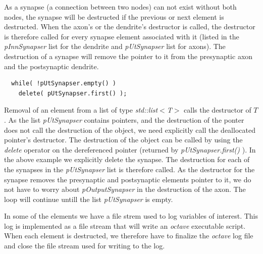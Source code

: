 	As a synapse (a connection between two nodes) can not exist without both nodes, the synapse will be destructed if the previous or next element is destructed.
	When the axon's or the dendrite's destructor is called, the destructor is therefore called for every synapse element associated with it (listed in the \emph{pInnSynapser} list for the dendrite and \emph{pUtSynapser} list for axons).
	The destruction of a synapse will remove the pointer to it from the presynaptic axon and the postsynaptic dendrite.
%

\begin{lstlisting}
  while( !pUtSynapser.empty() )
  	delete( pUtSynapser.first() );
\end{lstlisting}

	Removal of an element from a list of type \emph{std::list$<$T$>$} calls the destructor of $T$.
	As the list \emph{pUtSynapser} contains pointers, and the destruction of the ponter does not call the destruction of the object, we need explicitly call the deallocated pointer's destructor.
	The destruction of the object can be called by using the \emph{delete} operator on the dereferenced pointer (returned by \emph{pUtSynapser.first()} ).
	In the above example we explicitly delete the synapse. %
	The destruction for each of the synapses in the \emph{pUtSynapser} list is therefore called.
	As the destructor for the synapse removes the presynaptic and postsynaptic elements pointer to it, we do not have to worry about \emph{pOutputSynapser} in the destruction of the axon.
	The loop will continue untill the list \emph{pUtSynapser} is empty.


	In some of the elements we have a file strem used to log variables of interest.
	This log is implemented as a file stream that will write an \emph{octave} executable script.
	When each element is destructed, we therefore have to finalize the \emph{octave} log file and close the file stream used for writing to the log. 


